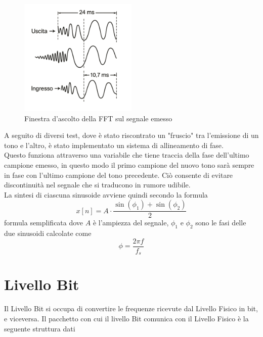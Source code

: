     \begin{figure}[H]
        \centering
        \includegraphics[width=0.5\textwidth]{immagini/window_listening.png}
        \caption{Finestra d'ascolto della FFT sul segnale emesso}
        \label{fig:finestra_ascolto}
    \end{figure}

A seguito di diversi test, dove è stato riscontrato un "fruscio" tra l'emissione di un tono e l'altro,
 è stato implementato un sistema di allineamento di fase. \\
Questo funziona attraverso una variabile che tiene traccia della fase dell'ultimo campione emesso,
 in questo modo il primo campione del nuovo tono sarà sempre in fase con l'ultimo campione del tono precedente.
 Ciò consente di evitare discontinuità nel segnale che si traducono in rumore udibile.\\
 La sintesi di ciascuna sinusoide avviene quindi secondo la formula
\begin{equation}
    x[n] = A \cdot \frac{\sin(\phi_1)+\sin(\phi_2)}{2}
\end{equation}
formula semplificata dove $A$ è l'ampiezza del segnale, $\phi_1$ e $\phi_2$ sono le fasi delle due sinusoidi calcolate come 
\begin{equation}
    \phi = \frac{2 \pi f}{f_s}
\end{equation}

\section{Livello Bit}
Il Livello Bit si occupa di convertire le frequenze ricevute dal Livello Fisico in bit, e viceversa.
Il pacchetto con cui il livello Bit comunica con il Livello Fisico è la seguente struttura dati 



